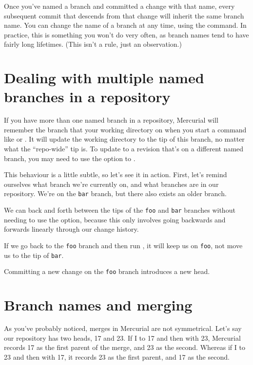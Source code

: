 Once you've named a branch and committed a change with that name,
every subsequent commit that descends from that change will inherit
the same branch name.  You can change the name of a branch at any
time, using the  command.  
In practice, this is something you won't do very often, as branch
names tend to have fairly long lifetimes.  (This isn't a rule, just an
observation.)

\section{Dealing with multiple named branches in a repository}

If you have more than one named branch in a repository, Mercurial will
remember the branch that your working directory on when you start a
command like  or .  It will update
the working directory to the tip of this branch, no matter what the
``repo-wide'' tip is.  To update to a revision that's on a different
named branch, you may need to use the  option to
.

This behaviour is a little subtle, so let's see it in action.  First,
let's remind ourselves what branch we're currently on, and what
branches are in our repository.
We're on the \texttt{bar} branch, but there also exists an older
 branch.

We can  back and forth between the tips of the
\texttt{foo} and \texttt{bar} branches without needing to use the
 option, because this only involves going backwards
and forwards linearly through our change history.

If we go back to the \texttt{foo} branch and then run ,
it will keep us on \texttt{foo}, not move us to the tip of
\texttt{bar}.

Committing a new change on the \texttt{foo} branch introduces a new
head.

\section{Branch names and merging}

As you've probably noticed, merges in Mercurial are not symmetrical.
Let's say our repository has two heads, 17 and 23.  If I
 to 17 and then  with 23, Mercurial records
17 as the first parent of the merge, and 23 as the second.  Whereas if
I  to 23 and then  with 17, it records 23
as the first parent, and 17 as the second.

